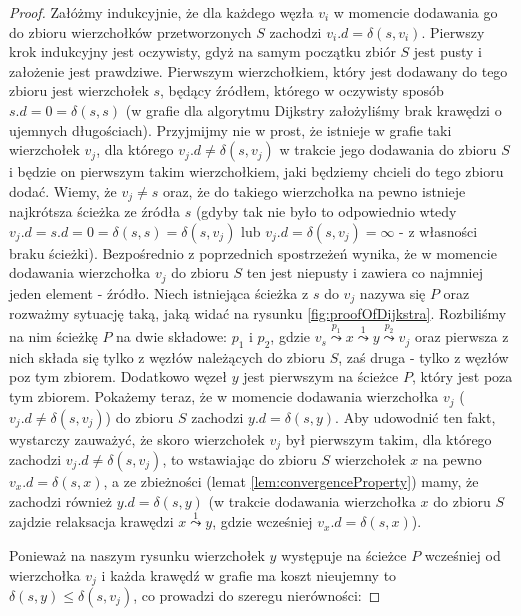 \begin{proof}
Załóżmy indukcyjnie, że dla każdego węzła $v_{i}$ w momencie dodawania go do zbioru wierzchołków przetworzonych $S$ zachodzi $v_{i}.d = \delta \left( s, v_{i} \right)$. Pierwszy krok indukcyjny jest oczywisty, gdyż na samym początku zbiór $S$ jest pusty i założenie jest prawdziwe. Pierwszym wierzchołkiem, który jest dodawany do tego zbioru jest wierzchołek $s$, będący źródłem, którego w oczywisty sposób $s.d = 0 = \delta \left( s, s \right)$ (w grafie dla algorytmu Dijkstry założyliśmy brak krawędzi o ujemnych długościach). Przyjmijmy nie w prost, że istnieje w grafie taki wierzchołek $v_{j}$, dla którego $v_{j}.d \neq \delta \left( s, v_{j} \right)$ w trakcie jego dodawania do zbioru $S$ i będzie on pierwszym takim wierzchołkiem, jaki będziemy chcieli do tego zbioru dodać. Wiemy, że $v_{j} \neq s$ oraz, że do takiego wierzchołka na pewno istnieje najkrótsza ścieżka ze źródła $s$ (gdyby tak nie było to odpowiednio wtedy $v_{j}.d = s.d = 0 = \delta \left( s, s \right) = \delta \left( s, v_{j} \right)$ lub $v_{j}.d = \delta \left( s, v_{j} \right) = \infty $ - z własności braku ścieżki). Bezpośrednio z poprzednich spostrzeżeń wynika, że w momencie dodawania wierzchołka $v_{j}$ do zbioru $S$ ten jest niepusty i zawiera co najmniej jeden element - źródło. Niech istniejąca ścieżka z $s$ do $v_{j}$ nazywa się $P$ oraz rozważmy sytuację taką, jaką widać na rysunku \ref{fig:proofOfDijkstra}. Rozbiliśmy na nim ścieżkę $P$ na dwie składowe: $p_{1}$ i $p_{2}$, gdzie $v_{s} \overset{p_{1}}\leadsto x \overset{1}\leadsto y \overset{p_{2}}\leadsto v_{j}$ oraz pierwsza z nich składa się tylko z węzłów należących do zbioru $S$, zaś druga - tylko z węzłów poz tym zbiorem. Dodatkowo węzeł $y$ jest pierwszym na ścieżce $P$, który jest poza tym zbiorem. Pokażemy teraz, że w momencie dodawania wierzchołka $v_{j}$ ($v_{j}.d \neq \delta \left( s, v_{j} \right)$) do zbioru $S$ zachodzi $y.d = \delta \left( s, y \right)$. Aby udowodnić ten fakt, wystarczy zauważyć, że skoro wierzchołek $v_{j}$ był pierwszym takim, dla którego zachodzi $v_{j}.d \neq \delta \left( s, v_{j} \right)$, to wstawiając do zbioru $S$ wierzchołek $x$ na pewno $v_x.d = \delta \left( s, x \right)$, a ze zbieżności (lemat \ref{lem:convergenceProperty}) mamy, że zachodzi również $y.d = \delta \left( s, y \right)$ (w trakcie dodawania wierzchołka $x$ do zbioru $S$ zajdzie relaksacja krawędzi $x \overset{1}\leadsto y$, gdzie wcześniej $v_x.d = \delta \left( s, x \right)$).

Ponieważ na naszym rysunku wierzchołek $y$ występuje na ścieżce $P$ wcześniej od wierzchołka $v_{j}$ i każda krawędź w grafie ma koszt nieujemny to $ \delta \left( s, y \right) \leqslant \delta \left( s, v_{j} \right) $, co prowadzi do szeregu nierówności:


\end{proof}
